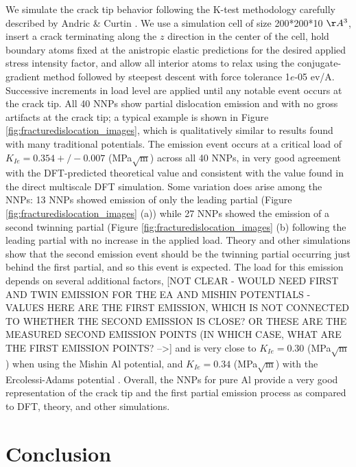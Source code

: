 \documentclass{article}
\begin{document}
We simulate the crack tip behavior following the K-test methodology carefully described by Andric \& Curtin \cite{Andric2019AtomisticFracture}.  We use a simulation cell of size 200*200*10 $\AA^3$, insert a crack terminating along the $z$ direction in the center of the cell, hold boundary atoms fixed at the anistropic elastic predictions for the desired applied stress intensity factor, and allow all interior atoms to relax using the conjugate-gradient method followed by steepest descent with force tolerance 1$e$-05 ev/A.  Successive increments in load level are applied until any notable event occurs at the crack tip.
All 40 NNPs show partial dislocation emission and with no gross artifacts at the crack tip; a typical example is shown in Figure \ref{fig:fracturedislocation_images}, which is qualitatively similar to results found with many traditional potentials.  The emission event occurs at a critical load of $K_{Ie}=0.354+/-0.007$ (MPa$\sqrt{\text{m}}$) across all 40 NNPs, in very good agreement with the DFT-predicted theoretical value and consistent with the value found in the direct multiscale DFT simulation.  Some variation does arise among the NNPs: 13 NNPs showed emission of only the leading partial (Figure \ref{fig:fracturedislocation_images} (a)) while 27 NNPs showed the emission of a second twinning partial (Figure \ref{fig:fracturedislocation_images} (b) following the leading partial with no increase in the applied load.  Theory and other simulations show that the second emission event should be the twinning partial occurring just behind the first partial, and so this event is expected.  The load for this emission depends on several additional factors, [NOT CLEAR - WOULD NEED FIRST AND TWIN EMISSION FOR THE EA AND MISHIN POTENTIALS - VALUES HERE ARE THE FIRST EMISSION, WHICH IS NOT CONNECTED TO WHETHER THE SECOND EMISSION IS CLOSE?  OR THESE ARE THE MEASURED SECOND EMISSION POINTS (IN WHICH CASE, WHAT ARE THE FIRST EMISSION POINTS? -->] and is very close to $K_{Ie}=0.30$ (MPa$\sqrt{\text{m}}$) when using the Mishin Al potential, and $K_{Ie}=0.34$ (MPa$\sqrt{\text{m}}$) with the Ercolessi-Adams potential \cite{Mishin1999InteratomicCalculations, Ercolesi1994InteratomicMethod, Andric2017NewEmission}.   Overall, the NNPs for pure Al provide a very good representation of the crack tip and the first partial emission process as compared to DFT, theory, and other simulations.



\section{Conclusion}
\end{document}
